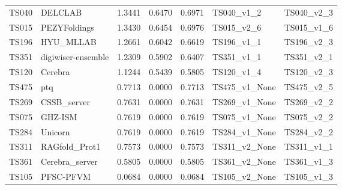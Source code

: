 \begin{table}[ht]
{\begin{tabular}{llrrrll}
TS040 & DELCLAB & 1.3441 & 0.6470 & 0.6971 & TS040\_v1\_2 & TS040\_v2\_3 \\ 
TS015 & PEZYFoldings & 1.3430 & 0.6454 & 0.6976 & TS015\_v2\_6 & TS015\_v1\_6 \\ 
TS196 & HYU\_MLLAB & 1.2661 & 0.6042 & 0.6619 & TS196\_v1\_1 & TS196\_v2\_3 \\ 
TS351 & digiwiser-ensemble & 1.2309 & 0.5902 & 0.6407 & TS351\_v1\_1 & TS351\_v2\_1 \\ 
TS120 & Cerebra & 1.1244 & 0.5439 & 0.5805 & TS120\_v1\_4 & TS120\_v2\_3 \\ 
TS475 & ptq & 0.7713 & 0.0000 & 0.7713 & TS475\_v1\_None & TS475\_v2\_5 \\ 
TS269 & CSSB\_server & 0.7631 & 0.0000 & 0.7631 & TS269\_v1\_None & TS269\_v2\_2 \\ 
TS075 & GHZ-ISM & 0.7619 & 0.0000 & 0.7619 & TS075\_v1\_None & TS075\_v2\_2 \\ 
TS284 & Unicorn & 0.7619 & 0.0000 & 0.7619 & TS284\_v1\_None & TS284\_v2\_2 \\ 
TS311 & RAGfold\_Prot1 & 0.7573 & 0.0000 & 0.7573 & TS311\_v2\_None & TS311\_v1\_1 \\ 
TS361 & Cerebra\_server & 0.5805 & 0.0000 & 0.5805 & TS361\_v2\_None & TS361\_v1\_3 \\ 
TS105 & PFSC-PFVM & 0.0684 & 0.0000 & 0.0684 & TS105\_v2\_None & TS105\_v1\_3 \\ 
\bottomrule
\end{tabular}%
}
\end{table}

